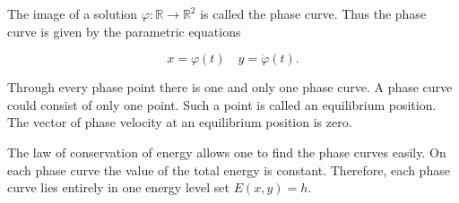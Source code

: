 The image of a solution $\varphi: \mathbb{R} \rightarrow \mathbb{R}^2$ is called the phase curve. Thus the phase curve is given by the parametric equations

$$x = \varphi(t) \quad y = \dot{\varphi}(t).$$

Through every phase point there is one and only one phase curve. A phase curve could consist of only one point. Such a point is called an equilibrium position. The vector of phase velocity at an equilibrium position is zero.

The law of conservation of energy allows one to find the phase curves easily. On each phase curve the value of the total energy is constant. Therefore, each phase curve lies entirely in one energy level set $E(x, y) = h$.
